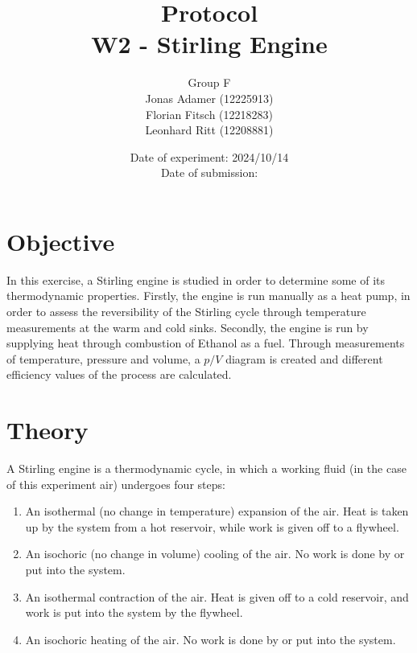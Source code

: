 \documentclass[titlepage]{article}
\title{Protocol \\ W2 - Stirling Engine}
\author{Group F\\Jonas Adamer (12225913)\\Florian Fitsch (12218283)\\Leonhard Ritt (12208881)}
\date{Date of experiment: 2024/10/14\\Date of submission:}
\begin{document}
\maketitle
\thispagestyle{empty}

\newpage
\tableofcontents
\thispagestyle{empty}


\newpage
\section{Objective}
In this exercise, a Stirling engine is studied in order to determine some of its thermodynamic properties. Firstly, the engine is run manually as a heat pump, in order to assess the reversibility of the Stirling cycle through temperature measurements at the warm and cold sinks. Secondly, the engine is run by supplying heat through combustion of Ethanol as a fuel. Through measurements of temperature, pressure and volume, a \(p/V\) diagram is created and different efficiency values of the process are calculated.


\section{Theory}
A Stirling engine is a thermodynamic cycle, in which a working fluid (in the case of this experiment air) undergoes four steps:
%
\begin{enumerate}
    \item An isothermal (no change in temperature) expansion of the air. Heat is taken up by the system from a hot reservoir, while work is given off to a flywheel.
    \item An isochoric (no change in volume) cooling of the air. No work is done by or put into the system.
    \item An isothermal contraction of the air. Heat is given off to a cold reservoir, and work is put into the system by the flywheel.
    \item An isochoric heating of the air. No work is done by or put into the system.
\end{enumerate}
\end{document}

